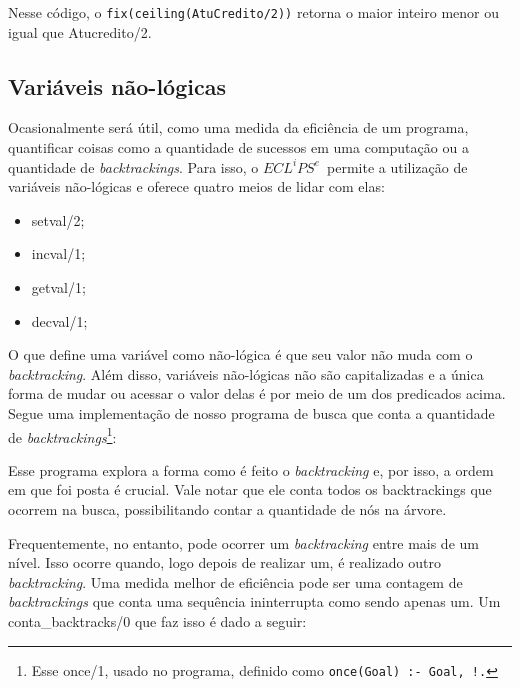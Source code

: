 \documentclass{article}
\newcommand{\eclipse}{$ECL^iPS^e$}
\begin{document}


Nesse código, o {\tt fix(ceiling(AtuCredito/2))} retorna o maior inteiro menor ou igual que Atucredito/2.

\subsection{Variáveis não-lógicas}

  Ocasionalmente será útil, como uma medida da eficiência de um programa, quantificar coisas como a quantidade de sucessos em uma computação ou a quantidade de \textit{backtrackings}. Para isso, o \eclipse\ permite a utilização de variáveis não-lógicas e oferece quatro meios de lidar com elas:

  \begin{itemize}
    \item setval/2;
    \item incval/1;
    \item getval/1;
    \item decval/1;
  \end{itemize}

  O que define uma variável como não-lógica é que seu valor não muda com o \textit{backtracking}. Além disso, variáveis não-lógicas não são capitalizadas e a única forma de mudar ou acessar o valor delas é por meio de um dos predicados acima. Segue uma implementação de nosso programa de busca que conta a quantidade de \textit{backtrackings}\footnote{Esse once/1, usado no programa, definido como {\tt once(Goal) :- Goal, !.}}:



Esse programa explora a forma como é feito o \textit{backtracking} e, por isso, a ordem em que foi posta é crucial. Vale notar que ele conta todos os backtrackings que ocorrem na busca, possibilitando contar a quantidade de nós na árvore.

Frequentemente, no entanto, pode ocorrer um \textit{backtracking} entre mais de um nível. Isso ocorre quando, logo depois de realizar um, é realizado outro \textit{backtracking}. Uma medida melhor de eficiência pode ser uma contagem de \textit{backtrackings} que conta uma sequência ininterrupta como sendo apenas um. Um conta\_backtracks/0 que faz isso é dado a seguir:


\end{document}
